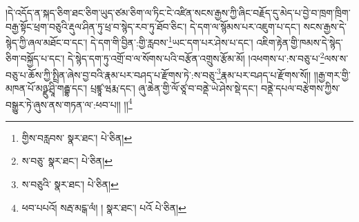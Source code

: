 །དེ་འདོད་ན་སྐད་ཅིག་ཐང་ཅིག་ཡུད་ཙམ་ཅིག་ལ་ཏིང་ངེ་འཛིན་སངས་རྒྱས་ཀྱི་ཞིང་བརྗོད་དུ་མེད་པ་བྱེ་བ་ཁྲག་ཁྲིག་བརྒྱ་སྟོང་ཕྲག་བཅུའི་རྡུལ་ཤིན་ཏུ་ཕྲ་བ་སྙེད་རབ་ཏུ་ཐོབ་ཅིང་། དེ་དག་ལ་སྙོམས་པར་འཇུག་པ་དང་། སངས་རྒྱས་དེ་སྙེད་ཀྱི་ཞལ་མཐོང་བ་དང་། དེ་དག་གི་བྱིན་:གྱི་རླབས་\footnote{གྱིས་བརླབས་  སྣར་ཐང་།  པེ་ཅིན། }ཡང་དག་པར་ཤེས་པ་དང་། འཇིག་རྟེན་གྱི་ཁམས་དེ་སྙེད་ཅིག་བསྐྱོད་པ་དང་། དེ་སྙེད་དག་ཏུ་འགྲོ་བ་ལ་སོགས་པའི་བརྩོན་འགྲུས་རྩོམ་མོ། །འཕགས་པ་:ས་བཅུ་པ་\footnote{ས་བཅུ་  སྣར་ཐང་།  པེ་ཅིན། }ལས་ས་བཅུ་པ་ཆོས་ཀྱི་སྤྲིན་ཞེས་བྱ་བའི་རྣམ་པར་བཤད་པ་རྫོགས་ཏེ་:ས་བཅུ་\footnote{ས་བཅུའི་  སྣར་ཐང་།  པེ་ཅིན། }རྣམ་པར་བཤད་པ་རྫོགས་སོ།། །།རྒྱ་གར་གྱི་མཁན་པོ་མཉྫུ་ཤྲཱི་གརྦྷ་དང་། པྲཛྙཱ་ཝརྨ་དང་། ཞུ་ཆེན་གྱི་ལོ་ཙཱ་བ་བནྡེ་ཡེ་ཤེས་སྡེ་དང་། བནྡེ་དཔལ་བརྩེགས་ཀྱིས་བསྒྱུར་ཏེ་ཞུས་ནས་གཏན་ལ་:ཕབ་པ།། །།\footnote{ཕབ་པཔའོ། སརྦ་མངྒ་ལཾ། །  སྣར་ཐང་། པའོ  པེ་ཅིན། }